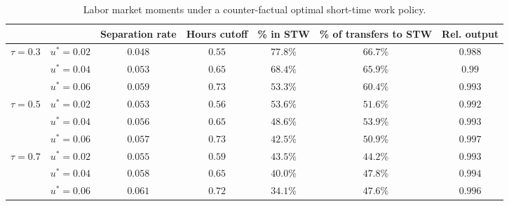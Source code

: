 \begin{table}\centering 
	    \renewcommand{\arraystretch}{1.7} 
	     \begin{tabular}{@{}llccccc@{}} \toprule 
	 	 & & Separation rate & Hours cutoff & \% in STW & \% of transfers to STW & Rel. output  \\ 
\midrule  
	 	 $\tau = 0.3$  &  $u^*=0.02$  &  $0.048$  &  $0.55$  &  $77.8$\%  &  $66.7$\%  &  $0.988$   \\ 
	 	   &  $u^*=0.04$  &  $0.053$  &  $0.65$  &  $68.4$\%  &  $65.9$\%  &  $0.99$   \\ 
	 	   &  $u^*=0.06$  &  $0.059$  &  $0.73$  &  $53.3$\%  &  $60.4$\%  &  $0.993$   \\ 
	 	 $\tau = 0.5$  &  $u^*=0.02$  &  $0.053$  &  $0.56$  &  $53.6$\%  &  $51.6$\%  &  $0.992$   \\ 
	 	   &  $u^*=0.04$  &  $0.056$  &  $0.65$  &  $48.6$\%  &  $53.9$\%  &  $0.993$   \\ 
	 	   &  $u^*=0.06$  &  $0.057$  &  $0.73$  &  $42.5$\%  &  $50.9$\%  &  $0.997$   \\ 
	 	 $\tau = 0.7$  &  $u^*=0.02$  &  $0.055$  &  $0.59$  &  $43.5$\%  &  $44.2$\%  &  $0.993$   \\ 
	 	   &  $u^*=0.04$  &  $0.058$  &  $0.65$  &  $40.0$\%  &  $47.8$\%  &  $0.994$   \\ 
	 	   &  $u^*=0.06$  &  $0.061$  &  $0.72$  &  $34.1$\%  &  $47.6$\%  &  $0.996$   \\ 
	 	 \bottomrule 
	 \end{tabular} 
	 \caption{Labor market moments under a counter-factual optimal short-time work policy.} 
	 \label{tab:counterfactual} 
\end{table}